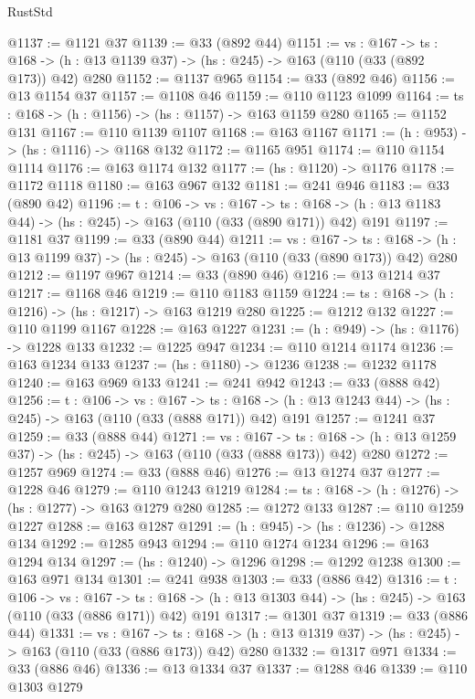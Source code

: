 \begin{lexlean}{RustStd}
\begin{coremodule}
@1137 := @1121 @37
@1139 := @33 (@892 @44)
@1151 := {vs : @167} ->
  {ts : @168} -> (h : @13 @1139 @37) -> (hs : @245) -> @163 (@110 (@33 (@892 @173)) @42) @280
@1152 := @1137 @965
@1154 := @33 (@892 @46)
@1156 := @13 @1154 @37
@1157 := @1108 @46
@1159 := @110 @1123 @1099
@1164 := {ts : @168} -> (h : @1156) -> (hs : @1157) -> @163 @1159 @280
@1165 := @1152 @131
@1167 := @110 @1139 @1107
@1168 := @163 @1167
@1171 := (h : @953) -> (hs : @1116) -> @1168 @132
@1172 := @1165 @951
@1174 := @110 @1154 @1114
@1176 := @163 @1174 @132
@1177 := (hs : @1120) -> @1176
@1178 := @1172 @1118
@1180 := @163 @967 @132
@1181 := @241 @946
@1183 := @33 (@890 @42)
@1196 := {t : @106} ->
  {vs : @167} ->
  {ts : @168} -> (h : @13 @1183 @44) -> (hs : @245) -> @163 (@110 (@33 (@890 @171)) @42) @191
@1197 := @1181 @37
@1199 := @33 (@890 @44)
@1211 := {vs : @167} ->
  {ts : @168} -> (h : @13 @1199 @37) -> (hs : @245) -> @163 (@110 (@33 (@890 @173)) @42) @280
@1212 := @1197 @967
@1214 := @33 (@890 @46)
@1216 := @13 @1214 @37
@1217 := @1168 @46
@1219 := @110 @1183 @1159
@1224 := {ts : @168} -> (h : @1216) -> (hs : @1217) -> @163 @1219 @280
@1225 := @1212 @132
@1227 := @110 @1199 @1167
@1228 := @163 @1227
@1231 := (h : @949) -> (hs : @1176) -> @1228 @133
@1232 := @1225 @947
@1234 := @110 @1214 @1174
@1236 := @163 @1234 @133
@1237 := (hs : @1180) -> @1236
@1238 := @1232 @1178
@1240 := @163 @969 @133
@1241 := @241 @942
@1243 := @33 (@888 @42)
@1256 := {t : @106} ->
  {vs : @167} ->
  {ts : @168} -> (h : @13 @1243 @44) -> (hs : @245) -> @163 (@110 (@33 (@888 @171)) @42) @191
@1257 := @1241 @37
@1259 := @33 (@888 @44)
@1271 := {vs : @167} ->
  {ts : @168} -> (h : @13 @1259 @37) -> (hs : @245) -> @163 (@110 (@33 (@888 @173)) @42) @280
@1272 := @1257 @969
@1274 := @33 (@888 @46)
@1276 := @13 @1274 @37
@1277 := @1228 @46
@1279 := @110 @1243 @1219
@1284 := {ts : @168} -> (h : @1276) -> (hs : @1277) -> @163 @1279 @280
@1285 := @1272 @133
@1287 := @110 @1259 @1227
@1288 := @163 @1287
@1291 := (h : @945) -> (hs : @1236) -> @1288 @134
@1292 := @1285 @943
@1294 := @110 @1274 @1234
@1296 := @163 @1294 @134
@1297 := (hs : @1240) -> @1296
@1298 := @1292 @1238
@1300 := @163 @971 @134
@1301 := @241 @938
@1303 := @33 (@886 @42)
@1316 := {t : @106} ->
  {vs : @167} ->
  {ts : @168} -> (h : @13 @1303 @44) -> (hs : @245) -> @163 (@110 (@33 (@886 @171)) @42) @191
@1317 := @1301 @37
@1319 := @33 (@886 @44)
@1331 := {vs : @167} ->
  {ts : @168} -> (h : @13 @1319 @37) -> (hs : @245) -> @163 (@110 (@33 (@886 @173)) @42) @280
@1332 := @1317 @971
@1334 := @33 (@886 @46)
@1336 := @13 @1334 @37
@1337 := @1288 @46
@1339 := @110 @1303 @1279

\end{coremodule}
\end{lexlean}
